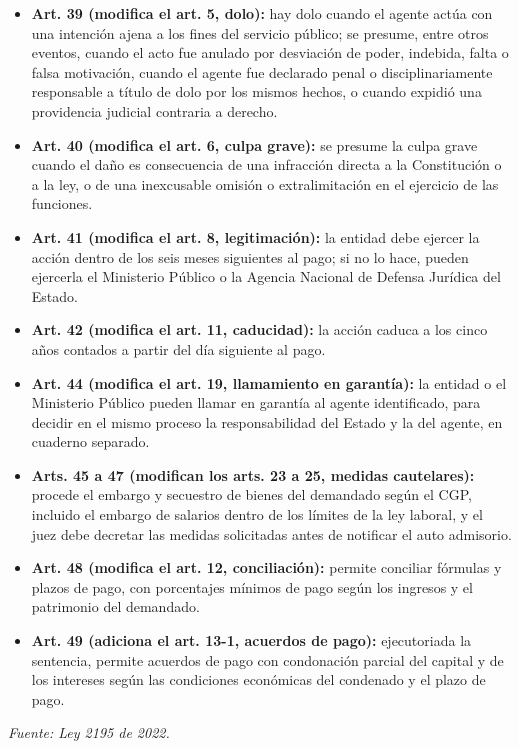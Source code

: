 \begin{itemize}
\item \textbf{Art. 39 (modifica el art. 5, dolo):} hay dolo cuando el agente actúa con una intención ajena a los fines del servicio público; se presume, entre otros eventos, cuando el acto fue anulado por desviación de poder, indebida, falta o falsa motivación, cuando el agente fue declarado penal o disciplinariamente responsable a título de dolo por los mismos hechos, o cuando expidió una providencia judicial contraria a derecho.
\item \textbf{Art. 40 (modifica el art. 6, culpa grave):} se presume la culpa grave cuando el daño es consecuencia de una infracción directa a la Constitución o a la ley, o de una inexcusable omisión o extralimitación en el ejercicio de las funciones.
\item \textbf{Art. 41 (modifica el art. 8, legitimación):} la entidad debe ejercer la acción dentro de los seis meses siguientes al pago; si no lo hace, pueden ejercerla el Ministerio Público o la Agencia Nacional de Defensa Jurídica del Estado.
\item \textbf{Art. 42 (modifica el art. 11, caducidad):} la acción caduca a los cinco años contados a partir del día siguiente al pago.
\item \textbf{Art. 44 (modifica el art. 19, llamamiento en garantía):} la entidad o el Ministerio Público pueden llamar en garantía al agente identificado, para decidir en el mismo proceso la responsabilidad del Estado y la del agente, en cuaderno separado.
\item \textbf{Arts. 45 a 47 (modifican los arts. 23 a 25, medidas cautelares):} procede el embargo y secuestro de bienes del demandado según el CGP, incluido el embargo de salarios dentro de los límites de la ley laboral, y el juez debe decretar las medidas solicitadas antes de notificar el auto admisorio.
\item \textbf{Art. 48 (modifica el art. 12, conciliación):} permite conciliar fórmulas y plazos de pago, con porcentajes mínimos de pago según los ingresos y el patrimonio del demandado.
\item \textbf{Art. 49 (adiciona el art. 13-1, acuerdos de pago):} ejecutoriada la sentencia, permite acuerdos de pago con condonación parcial del capital y de los intereses según las condiciones económicas del condenado y el plazo de pago.
\end{itemize}
{\small \textcolor[HTML]{6B6B6B}{\textit{Fuente: Ley 2195 de 2022.}}}

